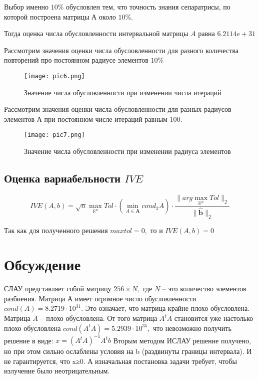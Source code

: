 \documentclass[a4]{article}
\begin{document}
Выбор именно $10\%$ обусловлен тем, что точность знания сепаратрисы, по которой построена матрицы $А$ около $10\%.$

Тогда оценка числа обусловленности интервальной матрицы $A$ равна $6.2114e+31$

Рассмотрим значения оценки числа обусловленности для разного количества повторений про постоянном радиусе элементов $10\%$

\begin{figure}[H]
\begin{center}
\caption{Значение числа обусловленности при изменении числа итераций}
\texttt{[image: pic6.png]} 
\end{center}
\end{figure}

Рассмотрим значения оценки числа обусловленности для разных радиусов элементов А при постоянном числе итераций равным $100.$

\begin{figure}[H]
\begin{center}
\caption{Значение числа обусловленности при изменении радиуса элементов}
\texttt{[image: pic7.png]} 
\end{center}
\end{figure}

\subsection{Оценка вариабельности $IVE$}
$$IVE(A,b)=\sqrt{n} \max\limits_{\mathbb{R}^n} Tol\cdot\left(\min\limits_{A\in\mathbf{A}}cond_2A\right)\cdot\frac{\|arg\max\limits_{\mathbb{R}^n}Tol\|_2}{\|\hat{\mathbf{b}}\|_2}$$

Так как для полученного решения $maxtol=0,$ то и $IVE(A,b)=0$ \hfill\cite{source4}


\section{Обсуждение}
СЛАУ представляет собой матрицу $256\times N,$ где $N$ – это количество элементов разбиения.
Матрица $А$ имеет огромное число обусловленности $cond(A)= 8.2719\cdot 10^{31}.$ Это означает, что матрица крайне плохо обусловлена. 
Матрица $A$ – плохо обусловлена. От того матрица $A^t A$ становится уже настолько плохо обусловлена $cond(A^t A)= 5.2939\cdot 10^{35},$ что невозможно получить решение в виде: $x=(A^t A)^{-1} A^t b$
Вторым методом ИСЛАУ решение получено, но при этом сильно ослаблены условия на b (раздвинуты границы интервала). И не гарантируется, что x≥0. А изначальная постановка задачи требует, чтобы излучение было неотрицательным.
\end{document}
